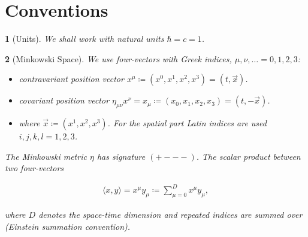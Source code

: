 \documentclass{article}
\theoremstyle{plain} %
\theoremstyle{convention} %
\newtheorem*{convention}{} %
\theoremstyle{remark} %
\numberwithin{equation}{section}
\begin{document}

\section{Conventions}

\begin{convention}[Units]
We shall work with natural units $\hbar = c = 1$.
\end{convention}

\begin{convention}[Minkowski Space]
We use four-vectors with Greek indices, $\mu, \nu, \dots = 0, 1, 2, 3$:
\begin{itemize}
  \item contravariant position vector $x^{\mu} \coloneqq (x^0, x^1, x^2, x^3) = (t, \vec{x})$.
  \item covariant position vector $\eta_{\mu \nu} x^{\nu} = x_{\mu} \coloneqq (x_0, x_1, x_2, x_3) = (t, -\vec{x})$.
  \item where $\vec{x} \coloneqq (x^1, x^2, x^3)$. For the spatial part Latin indices are used $i,j,k,l = 1, 2, 3$.
\end{itemize}

The Minkowski metric $\eta$ has signature $(+---)$. The scalar product between two four-vectors

\begin{align*}
  \langle x, y \rangle = x^{\mu} y_{\mu} \coloneqq \sum_{\mu=0}^D x^{\mu} y_{\mu},
\end{align*}

where $D$ denotes the space-time dimension and repeated indices are summed over (Einstein summation convention).

\end{convention}
\end{document}
